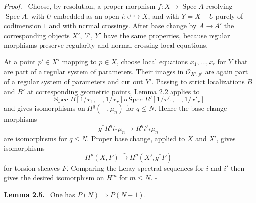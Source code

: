 \documentclass[12pt]{article}
\newcommand{\Oo}{\mathcal O}
\DeclareMathOperator{\Spec}{Spec}
\newcommand{\qedtext}{\hfill\(\square\)}
\newenvironment{statement}[1]{\par\medskip\noindent\textbf{#1.}\ }{\par\medskip}
\newenvironment{prooftext}[1][Proof]{\par\noindent\emph{#1.}\ }{\par\medskip}
\begin{document}
\begin{prooftext}
Choose, by resolution, a proper morphism $f:X\to\Spec A$ resolving $\Spec A$, with $U$ embedded as an open $i:U\hookrightarrow X$, and with $Y=X-U$ purely of codimension $1$ and with normal crossings. After base change by $A\to A'$ the corresponding objects $X'$, $U'$, $Y'$ have the same properties, because regular morphisms preserve regularity and normal-crossing local equations.

At a point $p'\in X'$ mapping to $p\in X$, choose local equations $x_1,
\ldots,x_r$ for $Y$ that are part of a regular system of parameters. Their images in $\Oo_{X',p'}$ are again part of a regular system of parameters and cut out $Y'$. Passing to strict localizations $B$ and $B'$ at corresponding geometric points, Lemma 2.2 applies to
\[
   \Spec B[1/x_1,\ldots,1/x_r]	o
   \Spec B'[1/x'_1,\ldots,1/x'_r]
\]
and gives isomorphisms on $H^q(-,\mu_n)$ for $q\leq N$. Hence the base-change morphisms
\[
   g^*R^qi_*\mu_n\longrightarrow R^qi'_*
\mu_n
\]
are isomorphisms for $q\leq N$. Proper base change, applied to $X$ and $X'$, gives isomorphisms
\[
   H^p(X,F)\xrightarrow{\sim}H^p(X',g^*F)
\]
for torsion sheaves $F$. Comparing the Leray spectral sequences for $i$ and $i'$ then gives the desired isomorphism on $H^m$ for $m\leq N$. \qedtext
\end{prooftext}

\begin{statement}{Lemma 2.5}
One has $P(N)\Rightarrow P(N+1)$.
\end{statement}
\end{document}
